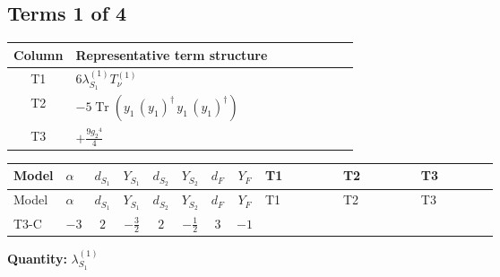 \documentclass[8pt]{article}
\begin{document}
\begin{landscape}
\subsection*{Terms 1 of 4}
\begin{center}
\begin{tabular}{@{}c >{\raggedright\arraybackslash}p{0.82\linewidth}@{}}
\toprule
Column & Representative term structure \\
\midrule
T1 & \(\displaystyle 6 {\lambda_{S_1}^{(1)}} T_{\nu}^{(1)}\) \\
\midrule
T2 & \(\displaystyle -5 \operatorname{Tr}\!\left({y_1}\,\left({y_1}\right)^{\dagger}\,{y_1}\,\left({y_1}\right)^{\dagger}\right)\) \\
\midrule
T3 & \(\displaystyle +\frac{9 {g_2}^4}{4}\) \\
\midrule
\bottomrule
\end{tabular}
\end{center}
\smallskip
\tiny
\begin{longtable}{@{}llcccccc >{\raggedright\arraybackslash}p{0.21\linewidth} >{\raggedright\arraybackslash}p{0.21\linewidth} >{\raggedright\arraybackslash}p{0.21\linewidth}@{}}
\toprule
Model & $\alpha$ & $d_{S_1}$ & $Y_{S_1}$ & $d_{S_2}$ & $Y_{S_2}$ & $d_F$ & $Y_F$ & T1 & T2 & T3 \\
\midrule
\endfirsthead
\toprule
Model & $\alpha$ & $d_{S_1}$ & $Y_{S_1}$ & $d_{S_2}$ & $Y_{S_2}$ & $d_F$ & $Y_F$ & T1 & T2 & T3 \\
\midrule
\endhead
T3-C & $-3$ & $2$ & $-\frac{3}{2}$ & $2$ & $-\frac{1}{2}$ & $3$ & $-1$ & \scriptsize\adjustbox{max width=\linewidth}{$\begin{gathered} 6 {\lambda_{S_1}^{(1)}} T_{\nu}^{(1)}\end{gathered}$} & \scriptsize\adjustbox{max width=\linewidth}{$\begin{gathered} -5 \operatorname{Tr}\!\left({y_1}\,\left({y_1}\right)^{\dagger}\,{y_1}\,\left({y_1}\right)^{\dagger}\right)\end{gathered}$} & \scriptsize\adjustbox{max width=\linewidth}{$\begin{gathered} +\frac{9 {g_2}^4}{4}\end{gathered}$} \\
\midrule
\bottomrule
\end{longtable}
\clearpage
\noindent\textbf{Quantity: }$\lambda_{S_1}^{(1)}$\par\smallskip

\end{landscape}
\end{document}
